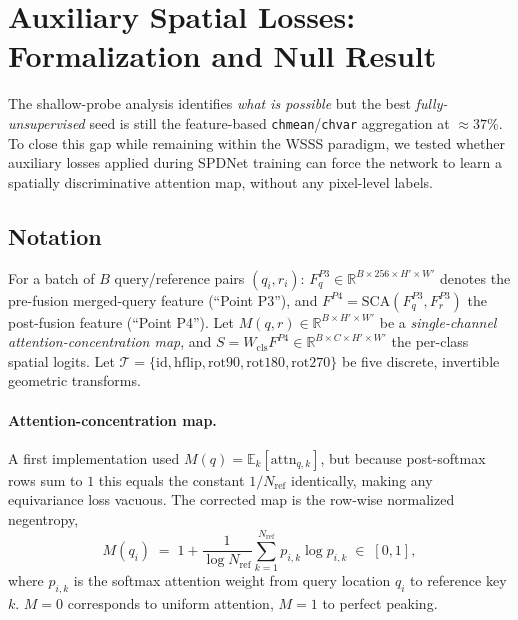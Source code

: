\documentclass[11pt,a4paper]{article}
\begin{document}
\section{Auxiliary Spatial Losses: Formalization and Null Result}
\label{sec:aux}

The shallow-probe analysis identifies \emph{what is possible} but the
best \emph{fully-unsupervised} seed is still the feature-based
\texttt{chmean}/\texttt{chvar} aggregation at $\approx\!37\%$. To close
this gap while remaining within the WSSS paradigm, we tested whether
auxiliary losses applied during SPDNet training can force the network
to learn a spatially discriminative attention map, without any
pixel-level labels.

\subsection{Notation}

For a batch of $B$ query/reference pairs $(q_i,r_i)$:
$F^{P3}_q\!\in\!\mathbb{R}^{B\times 256\times H'\!\times\!W'}$ denotes
the pre-fusion merged-query feature (``Point P3''), and
$F^{P4}\!=\!\mathrm{SCA}(F^{P3}_q,F^{P3}_r)$ the post-fusion feature
(``Point P4''). Let $M(q,r)\!\in\!\mathbb{R}^{B\times H'\!\times W'}$
be a \emph{single-channel attention-concentration map}, and
$S\!=\!W_{\mathrm{cls}}F^{P4}\!\in\!\mathbb{R}^{B\times C\times H'\!\times W'}$
the per-class spatial logits. Let $\mathcal{T}\!=\!\{\mathrm{id},
\mathrm{hflip},\mathrm{rot90},\mathrm{rot180},\mathrm{rot270}\}$ be
five discrete, invertible geometric transforms.

\paragraph{Attention-concentration map.}
A first implementation used $M(q)\!=\!\mathbb{E}_{k}[\mathrm{attn}_{q,k}]$,
but because post-softmax rows sum to $1$ this equals the constant
$1/N_{\mathrm{ref}}$ identically, making any equivariance loss vacuous.
The corrected map is the row-wise normalized negentropy,
\begin{equation}
M(q_i) \;=\; 1 + \frac{1}{\log N_{\mathrm{ref}}}
\sum_{k=1}^{N_{\mathrm{ref}}} p_{i,k}\log p_{i,k}\;\in\;[0,1],
\label{eq:attn_conc}
\end{equation}
where $p_{i,k}$ is the softmax attention weight from query location $q_i$
to reference key $k$. $M=0$ corresponds to uniform attention,
$M=1$ to perfect peaking.
\end{document}

